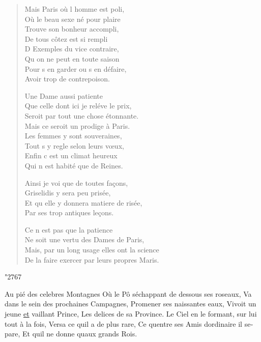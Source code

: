 \documentclass[14pt,a4paper]{memoir}
\newcommand{\ul}[1]{\uline{#1}}
\newcommand{\spacer}{%
  \par\vspace{1\baselineskip}%
  \begin{center}%
    {\HUGE \char"2767}%
  \end{center}%
  \vspace{1\baselineskip}\par%
}
\begin{document}
{{\begin{otherlanguage}{french}
\begin{verse}
\vin Mais Paris où l\textquotesingle{} homme est poli, \\
\vin Où le beau sexe né pour plaire \\
\vin Trouve son bonheur accompli, \\
\vin De tous côtez est si rempli \\
\vin D\textquotesingle{} Exemples du vice contraire, \\
\vin Qu\textquotesingle{} on ne peut en toute saison \\
\vin Pour s\textquotesingle{} en garder ou s\textquotesingle{} en défaire, \\
\vin Avoir trop de contrepoison.

\vin Une Dame aussi patiente \\
Que celle dont ici je reléve le prix, \\
\vin Seroit par tout une chose étonnante. \\
\vin Mais ce seroit un prodige à Paris. \\
\vin Les femmes y sont souveraines, \\
\vin Tout s\textquotesingle{} y regle selon leurs vœux, \\
\vin Enfin c\textquotesingle{} est un climat heureux \\
\vin Qui n\textquotesingle{} est habité que de Reines.

\vin Ainsi je voi que de toutes façons, \\
\vin Griselidis y sera peu prisée, \\
Et qu\textquotesingle{} elle y donnera matiere de risée, \\
\vin Par ses trop antiques leçons.

\vin Ce n\textquotesingle{} est pas que la patience \\
Ne soit une vertu des Dames de Paris, \\
Mais, par un long usage elles ont la science \\
De la faire exercer par leurs propres Maris.
\end{verse}

\spacer

{Au pié des celebres Montagnes} {Où le Pô s\textquotesingle échappant de
dessous ses roseaux,} {Va dans le sein des prochaines Campagnes,}
{Promener ses naissantes eaux,} {Vivoit un jeune \ul{et} vaillant
Prince,} {Les delices de sa Province.} {Le Ciel en le formant, sur lui
tout à la fois,} {Versa ce qu\textquotesingle il a de plus rare,} {Ce
qu\textquotesingle entre ses Amis d\textquotesingle ordinaire il
separe,} {Et qu\textquotesingle il ne donne qu\textquotesingle aux
grands Rois.}


\end{otherlanguage}}}
\end{document}
